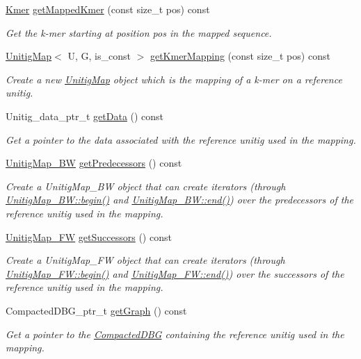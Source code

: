 \begin{DoxyCompactItemize}
\hyperlink{classKmer}{Kmer} \hyperlink{classUnitigMap_a9ac111e6783b3344f0db407d05f1b966}{get\+Mapped\+Kmer} (const size\+\_\+t pos) const
\begin{DoxyCompactList}\small\item\em Get the k-\/mer starting at position pos in the mapped sequence. \end{DoxyCompactList}\item 
\hyperlink{classUnitigMap}{Unitig\+Map}$<$ U, G, is\+\_\+const $>$ \hyperlink{classUnitigMap_af12f1d4e121afe7fe8324ddcdc9c6402}{get\+Kmer\+Mapping} (const size\+\_\+t pos) const
\begin{DoxyCompactList}\small\item\em Create a new \hyperlink{classUnitigMap}{Unitig\+Map} object which is the mapping of a k-\/mer on a reference unitig. \end{DoxyCompactList}\item 
Unitig\+\_\+data\+\_\+ptr\+\_\+t \hyperlink{classUnitigMap_a0c40fd1ba2df6af9a0c55b7963e41493}{get\+Data} () const
\begin{DoxyCompactList}\small\item\em Get a pointer to the data associated with the reference unitig used in the mapping. \end{DoxyCompactList}\item 
\hyperlink{classBackwardCDBG}{Unitig\+Map\+\_\+\+BW} \hyperlink{classUnitigMap_adfae0ba9c3675fd5612a4b71b46a25c6}{get\+Predecessors} () const
\begin{DoxyCompactList}\small\item\em Create a Unitig\+Map\+\_\+\+BW object that can create iterators (through \hyperlink{classBackwardCDBG_a134d64079a7acdcad727637647691897}{Unitig\+Map\+\_\+\+B\+W\+::begin()} and \hyperlink{classBackwardCDBG_a7b8f84da503325c3e3e2b5b024ed6997}{Unitig\+Map\+\_\+\+B\+W\+::end()}) over the predecessors of the reference unitig used in the mapping. \end{DoxyCompactList}\item 
\hyperlink{classForwardCDBG}{Unitig\+Map\+\_\+\+FW} \hyperlink{classUnitigMap_a5b2894e0f78e6b003d06a03a49904b59}{get\+Successors} () const
\begin{DoxyCompactList}\small\item\em Create a Unitig\+Map\+\_\+\+FW object that can create iterators (through \hyperlink{classForwardCDBG_a18fd34268b50793eabde303c3e9ed5db}{Unitig\+Map\+\_\+\+F\+W\+::begin()} and \hyperlink{classForwardCDBG_a83c2f8b929022aa77289177ec5ce7869}{Unitig\+Map\+\_\+\+F\+W\+::end()}) over the successors of the reference unitig used in the mapping. \end{DoxyCompactList}\item 
Compacted\+D\+B\+G\+\_\+ptr\+\_\+t \hyperlink{classUnitigMap_ab6bc6b4a479bef4a7cb9c72806679f5e}{get\+Graph} () const
\begin{DoxyCompactList}\small\item\em Get a pointer to the \hyperlink{classCompactedDBG}{Compacted\+D\+BG} containing the reference unitig used in the mapping. \end{DoxyCompactList}\end{DoxyCompactItemize}
